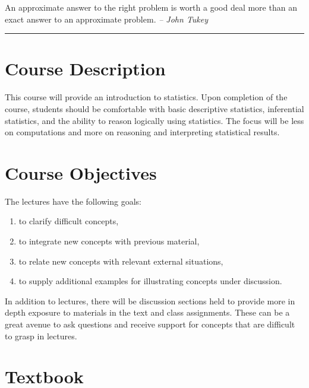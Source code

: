 \documentclass[11pt,article,oneside]{memoir}
\newenvironment{myquote}{\list{}{\leftmargin=1.25in\rightmargin=0.5in}\item[]}{\endlist}
\begin{document}
\vspace{.25in}


\begin{myquote}
An approximate answer to the right problem is worth a good deal more than an exact answer to an approximate problem. \hfill \emph{-- John Tukey} \\
\rule{\linewidth}{.4pt}
\end{myquote}






%
%

\section*{Course Description}
This course will provide an introduction to statistics. Upon completion of the course, students should be comfortable with basic descriptive statistics, inferential statistics, and the ability to reason logically using statistics. The focus will be less on computations and more on reasoning and interpreting statistical results.

\section*{Course Objectives}
The lectures have the following goals:
\begin{enumerate}
\item to clarify difficult concepts,
\item to integrate new concepts with previous material,
\item to relate new concepts with relevant external situations,
\item to supply additional examples for illustrating concepts under discussion.
\end{enumerate}

In addition to lectures, there will be discussion sections held to provide more in depth exposure to materials in the text and class assignments. These can be a great avenue to ask questions and receive support for concepts that are difficult to grasp in lectures.

\section*{Textbook}
\nocite{*}
\printbibliography[heading=none]
\end{document}
